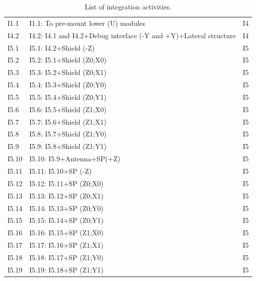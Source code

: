 \begin{table}[!htb]
\begin{tabular}{llc}
	I1.1     & I1.1: To pre-mount lower (U) modules                              & {I4} \\
    I4.2     & I4.2: I4.1 and I4.2+Debug interface (-Y and +Y)+Lateral structure & {I4} \\
    I5.1     & I5.1: I4.2+Shield (-Z)                                            & {I5} \\
    I5.2     & I5.2: I5.1+Shield (Z0;X0)                                         & {I5} \\
    I5.3     & I5.3: I5.2+Shield (Z0;X1)                                         & {I5} \\
    I5.4     & I5.4: I5.3+Shield (Z0;Y0)                                         & {I5} \\
    I5.5     & I5.5: I5.4+Shield (Z0;Y1)                                         & {I5} \\
    I5.6     & I5.6: I5.5+Shield (Z1;X0)                                         & {I5} \\
    I5.7     & I5.7: I5.6+Shield (Z1;X1)                                         & {I5} \\
    I5.8     & I5.8: I5.7+Shield (Z1;Y0)                                         & {I5} \\
    I5.9     & I5.9: I5.8+Shield (Z1;Y1)                                         & {I5} \\
    I5.10    & I5.10: I5.9+Antenna+SP(+Z)                                        & {I5} \\
    I5.11    & I5.11: I5.10+SP (-Z)                                              & {I5} \\
    I5.12    & I5.12: I5.11+SP (Z0;X0)                                           & {I5} \\
    I5.13    & I5.13: I5.12+SP (Z0;X1)                                           & {I5} \\
    I5.14    & I5.14: I5.13+SP (Z0;Y0)                                           & {I5} \\
    I5.15    & I5.15: I5.14+SP (Z0;Y1)                                           & {I5} \\
    I5.16    & I5.16: I5.15+SP (Z1;X0)                                           & {I5} \\
    I5.17    & I5.17: I5.16+SP (Z1;X1)                                           & {I5} \\
    I5.18    & I5.18: I5.17+SP (Z1;Y0)                                           & {I5} \\
    I5.19    & I5.19: I5.18+SP (Z1;Y1)                                           & {I5} \\
    \bottomrule[1.5pt]
	\end{tabular}
    \caption{List of integration activities.}
    \label{table_integration}
\end{table}

